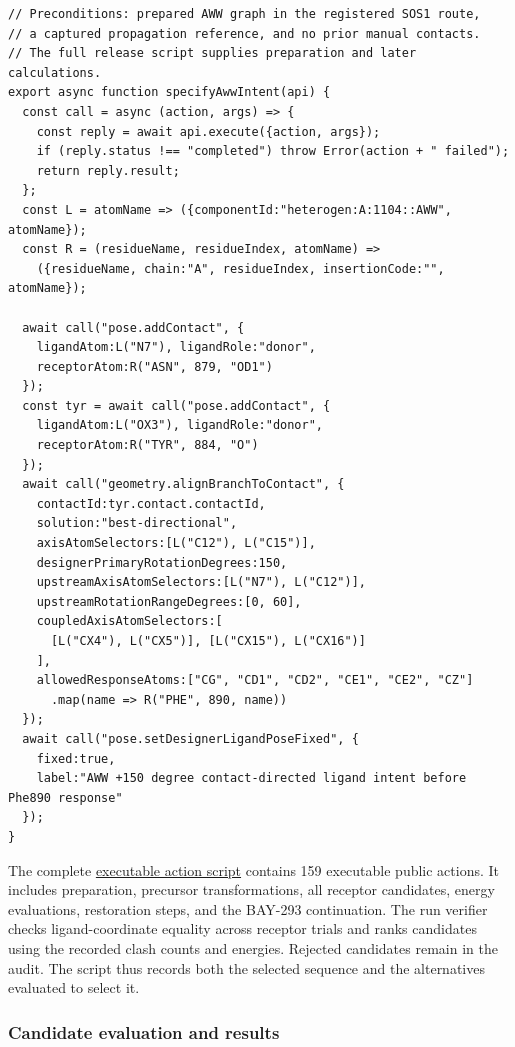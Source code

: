 \documentclass[11pt]{article}
\begin{document}
\begin{small}
\begin{lstlisting}[language={},float=htbp,caption={Public API code for the AWW ligand hypothesis and coordinate lock.},label={lst:sos1api}]
// Preconditions: prepared AWW graph in the registered SOS1 route,
// a captured propagation reference, and no prior manual contacts.
// The full release script supplies preparation and later calculations.
export async function specifyAwwIntent(api) {
  const call = async (action, args) => {
    const reply = await api.execute({action, args});
    if (reply.status !== "completed") throw Error(action + " failed");
    return reply.result;
  };
  const L = atomName => ({componentId:"heterogen:A:1104::AWW", atomName});
  const R = (residueName, residueIndex, atomName) =>
    ({residueName, chain:"A", residueIndex, insertionCode:"", atomName});

  await call("pose.addContact", {
    ligandAtom:L("N7"), ligandRole:"donor",
    receptorAtom:R("ASN", 879, "OD1")
  });
  const tyr = await call("pose.addContact", {
    ligandAtom:L("OX3"), ligandRole:"donor",
    receptorAtom:R("TYR", 884, "O")
  });
  await call("geometry.alignBranchToContact", {
    contactId:tyr.contact.contactId,
    solution:"best-directional",
    axisAtomSelectors:[L("C12"), L("C15")],
    designerPrimaryRotationDegrees:150,
    upstreamAxisAtomSelectors:[L("N7"), L("C12")],
    upstreamRotationRangeDegrees:[0, 60],
    coupledAxisAtomSelectors:[
      [L("CX4"), L("CX5")], [L("CX15"), L("CX16")]
    ],
    allowedResponseAtoms:["CG", "CD1", "CD2", "CE1", "CE2", "CZ"]
      .map(name => R("PHE", 890, name))
  });
  await call("pose.setDesignerLigandPoseFixed", {
    fixed:true,
    label:"AWW +150 degree contact-directed ligand intent before Phe890 response"
  });
}
\end{lstlisting}

The complete \href{https://molarium.org/design-history/publications/sos1/designer-intent-2026-09-04/executable.action-script.json}{executable action script} contains 159 executable public actions. It includes preparation, precursor transformations, all receptor candidates, energy evaluations, restoration steps, and the BAY-293 continuation. The run verifier checks ligand-coordinate equality across receptor trials and ranks candidates using the recorded clash counts and energies. Rejected candidates remain in the audit. The script thus records both the selected sequence and the alternatives evaluated to select it.

\subsubsection{Candidate evaluation and results}


\end{small}
\end{document}
